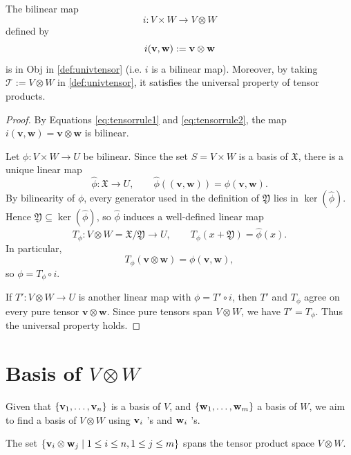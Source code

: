 \begin{theorem}\label{thm: univ-binlinear-map} 
The bilinear map
$$i : V \times W \rightarrow V \otimes W$$ 
defined by 
$$i({\bf v}, {\bf w}) := {\bf v} \otimes {\bf w}$$ 
is in \textnormal{Obj} in \autoref{def:univtensor} (i.e. $i$ is a bilinear map). Moreover, by taking $\mathcal{T} := V \otimes W$ in \autoref{def:univtensor}, it satisfies the universal property of tensor products.
\end{theorem}
\begin{proof}
By Equations \eqref{eq:tensorrule1} and \eqref{eq:tensorrule2}, the map $i(\mathbf v,\mathbf w)=\mathbf v\otimes\mathbf w$ is bilinear.

Let $\phi:V\times W\to U$ be bilinear. Since the set $S=V\times W$ is a basis of $\mathfrak X$, there is a unique linear map
\[
\widehat\phi:\mathfrak X\to U,
\qquad
\widehat\phi((\mathbf v,\mathbf w))=\phi(\mathbf v,\mathbf w).
\]
By bilinearity of $\phi$, every generator used in the definition of $\mathfrak Y$ lies in $\ker(\widehat\phi)$. Hence $\mathfrak Y\subseteq\ker(\widehat\phi)$, so $\widehat\phi$ induces a well-defined linear map
\[
T_\phi:V\otimes W=\mathfrak X/\mathfrak Y\to U,
\qquad
T_\phi(x+\mathfrak Y)=\widehat\phi(x).
\]
In particular,
\[
T_\phi(\mathbf v\otimes\mathbf w)=\phi(\mathbf v,\mathbf w),
\]
so $\phi=T_\phi\circ i$.

If $T':V\otimes W\to U$ is another linear map with $\phi=T'\circ i$, then $T'$ and $T_\phi$ agree on every pure tensor $\mathbf v\otimes\mathbf w$. Since pure tensors span $V\otimes W$, we have $T'=T_\phi$. Thus the universal property holds.
\end{proof}

\section{Basis of \(V \otimes W\)}

Given that \(\left\{  {{\bf v}_1,\ldots ,{\bf v}_n}\right\}\) is a basis of \(V\), and \(\left\{  {{\bf w}_1,\ldots ,{\bf w}_{m}}\right\}\) a basis of \(W\), we aim to find a basis of \(V \otimes  W\) using \({\bf v}_{i}\) ’s and \({\bf w}_{i}\) ’s.

\begin{proposition}\label{prop: tensor-span}
    The set \(\left\{  {{\bf v}_{i} \otimes  {\bf w}_{j} \mid  1 \leq  i \leq  n,1 \leq  j \leq  m}\right\}\) spans the tensor product space \(V \otimes  W\).
\end{proposition}

